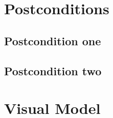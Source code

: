 \documentclass[notitlepage]{article}
\begin{document}
\begin{comment}
  \begin{color}{blue}
	 \noindent There may be, and most likely will be, a number of alternative flows in a use case.  Keep each alternative flow separate to improve clarity.  Using alternative flows improves the readability of the use case, as well as preventing use cases from being decomposed into hierarchies of use cases.  Keep in mind that use cases are just textual descriptions, and their main purpose is to document the behavior of a system in a clear, concise, and understandable way.
  \end{color}
\end{comment}

\section{Postconditions}\label{sec:postconditions}

\begin{comment}
  \begin{color}{blue}
     \noindent A postcondition of a use case is a list of possible states that the system can be in immediately after the use case has finished.
  \end{color}
\end{comment}

\subsection{Postcondition one}

\subsection{Postcondition two}

\section{Visual Model}
\begin{comment}
  \begin{color}{blue}
     \noindent Many use cases are enhanced by a visual model. A simple work-flow diagram can be used to visually show the sequence of steps and alternate and exception flows. A user interface mock-up can be used to show a possible representation of these user requirements in an interface (or a desired representation). In some organizations, a more formal UML diagram may be appropriate.
  \end{color}
\end{comment}
\end{document}
